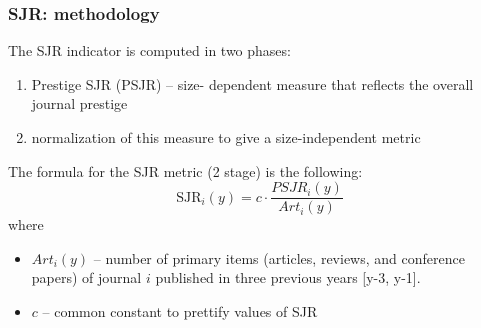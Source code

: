 \documentclass{beamer}
\begin{document}
\begin{frame}
    \frametitle{SJR: methodology}
    The SJR indicator is computed in two phases:
    \begin{enumerate}
        \item Prestige SJR (PSJR) -- size-
              dependent measure that reflects the overall journal prestige
        \item  normalization of this measure
              to give a size-independent metric
    \end{enumerate}

    The formula for the SJR metric (2 stage) is the following:
    \[
        \text{SJR}_i(y) = c \cdot \frac{PSJR_i(y)}{Art_i(y)}
    \]
    where
    \begin{itemize}
        \item $Art_i(y)$ -- number of primary items
              (articles, reviews, and conference papers) of journal $i$ published
              in three previous years [y-3, y-1].
        \item $c$ -- common constant to prettify values of SJR
    \end{itemize}
\end{frame}
\end{document}

